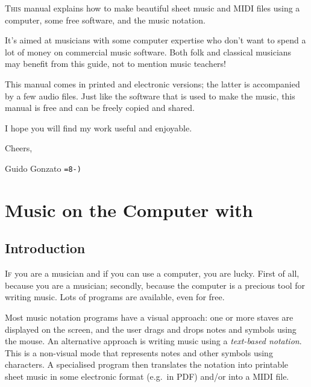 \documentclass[a4paper,12pt]{book}
\begin{document}
\lettrine{T}{his} manual explains how to make beautiful sheet music
and MIDI files using a computer, some free software, and the
\ABCPLUS{} music notation.

It's aimed at musicians with some computer expertise who don't want to
spend a lot of money on commercial music software. Both folk and
classical musicians may benefit from this guide, not to mention music
teachers!

This manual comes in printed and electronic versions; the latter is
accompanied by a few audio files. Just like the software that is used
to make the music, this manual is free and can be freely copied and
shared.

I hope you will find my work useful and enjoyable.

Cheers,

\hspace{2cm}Guido Gonzato \texttt{=8-)}

\vfill



\mainmatter

\pagestyle{headings}

\chapter{Music on the Computer with \ABCPLUS}

\section{Introduction}

\lettrine{I}{f} you are a musician and if you can use a computer, you
are lucky. First of all, because you are a musician; secondly, because
the computer is a precious tool for writing music. Lots of programs
are available, even for free.

Most music notation programs have a visual approach: one or more
staves are displayed on the screen, and the user drags and drops notes
and symbols using the mouse. An alternative approach is writing music
using a \emph{text-based notation}. This is a non-visual mode that
represents notes and other symbols using characters. A specialised
program then translates the notation into printable sheet music in
some electronic format (e.g.\ in PDF) and/or into a MIDI file.
\end{document}

